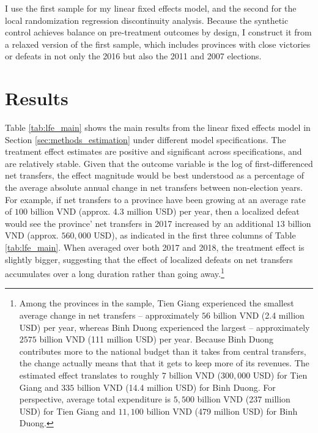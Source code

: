 \documentclass[12pt]{article}
\newcommand\fnote[1]{\footnote{\baselineskip=2\normalbaselineskip#1}}
\newcommand{\1}{\mathbbm{1}}
\begin{document}
I use the first sample for my linear fixed effects model, and the second for the local randomization regression discontinuity analysis. Because the synthetic control achieves balance on pre-treatment outcomes by design, I construct it from a relaxed version of the first sample, which includes provinces with close victories or defeats in not only the 2016 but also the 2011 and 2007 elections.



\section{Results}
\label{sec:results}


Table \ref{tab:lfe_main} shows the main results from the linear fixed effects model in Section \ref{sec:methods_estimation} under different model specifications. The treatment effect estimates are positive and significant across specifications, and are relatively stable. Given that the outcome variable is the log of first-differenced net transfers, the effect magnitude would be best understood as a percentage of the average absolute annual change in net transfers between non-election years. For example, if net transfers to a province have been growing at an average rate of $100$ billion VND (approx. 4.3 million USD) per year, then a localized defeat would see the province' net transfers in 2017 increased by an additional $13$ billion VND (approx. $560,000$ USD), as indicated in the first three columns of Table \ref{tab:lfe_main}. When averaged over both 2017 and 2018, the treatment effect is slightly bigger, suggesting that the effect of localized defeats on net transfers accumulates over a long duration rather than going away.\fnote{Among the provinces in the sample, Tien Giang experienced the smallest average change in net transfers -- approximately $56$ billion VND (2.4 million USD) per year, whereas Binh Duong experienced the largest -- approximately $2575$ billion VND (111 million USD) per year. Because Binh Duong contributes more to the national budget than it takes from central transfers, the change actually means that that it gets to keep more of its revenues. The estimated effect translates to roughly $7$ billion VND ($300,000$ USD) for Tien Giang and $335$ billion VND (14.4 million USD) for Binh Duong. For perspective, average total expenditure is $5,500$ billion VND (237 million USD) for Tien Giang and $11,100$ billion VND (479 million USD) for Binh Duong.}
\end{document}
